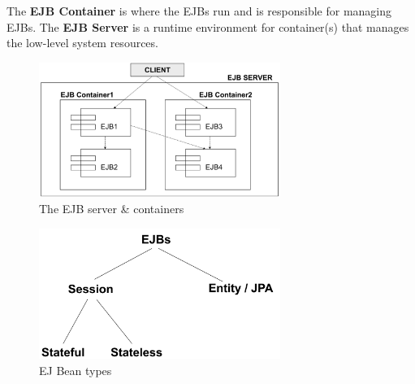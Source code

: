 \documentclass[a4paper,11pt]{article}
\begin{document}
The \textbf{EJB Container} is where the EJBs run and is responsible for managing EJBs.
The \textbf{EJB Server} is a runtime environment for container(s) that manages the low-level system resources.

\begin{figure}[H]
    \centering
    \includegraphics[width=0.7\textwidth]{./images/ejb_server_and_container.png}
    \caption{ The EJB server \& containers }
\end{figure}

\begin{figure}[H]
    \centering
    \includegraphics[width=0.7\textwidth]{./images/ejb_bean_types.png}
    \caption{ EJ Bean types }
\end{figure}
\end{document}
